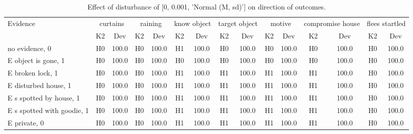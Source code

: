 \begin{table}\begin{tabular}{l|cc|cc|cc|cc|cc|cc|cc}\toprule\multirow{2}{*}{Evidence} & \multicolumn{2}{c}{curtains}& \multicolumn{2}{c}{raining}& \multicolumn{2}{c}{know object}& \multicolumn{2}{c}{target object}& \multicolumn{2}{c}{motive}& \multicolumn{2}{c}{compromise house}& \multicolumn{2}{c}{flees startled}\\& {K2} & {Dev}& {K2} & {Dev}& {K2} & {Dev}& {K2} & {Dev}& {K2} & {Dev}& {K2} & {Dev}& {K2} & {Dev}\\\midrule
no evidence, 0 & H0&100.0&H0&100.0&H1&100.0&H0&100.0&H0&100.0&H0&100.0&H0&100.0\\E object is gone, 1 & H0&100.0&H0&100.0&H0&100.0&H0&100.0&H0&100.0&H0&100.0&H0&100.0\\E broken lock, 1 & H0&100.0&H0&100.0&H1&100.0&H1&100.0&H1&100.0&H1&100.0&H0&100.0\\E disturbed house, 1 & H0&100.0&H0&100.0&H1&100.0&H1&100.0&H1&100.0&H1&100.0&H0&100.0\\E s spotted by house, 1 & H0&100.0&H0&100.0&H1&100.0&H1&100.0&H1&100.0&H1&100.0&H0&100.0\\E s spotted with goodie, 1 & H0&100.0&H0&100.0&H1&100.0&H1&100.0&H1&100.0&H1&100.0&H0&100.0\\E private, 0 & H0&100.0&H0&100.0&H1&100.0&H1&100.0&H1&100.0&H1&100.0&H0&100.0\\\bottomrule\end{tabular}\caption{Effect of disturbance of [0, 0.001, 'Normal (M, sd)'] on direction of outcomes.}\end{table}